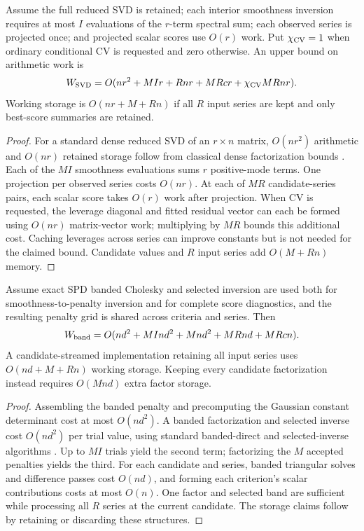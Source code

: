 \begin{theorem}\label{thm:svdwork}
Assume the full reduced SVD is retained; each interior smoothness inversion requires at most $I$ evaluations of the $r$-term spectral sum; each observed series is projected once; and projected scalar scores use $O(r)$ work. Put $\chi_{\rm CV}=1$ when ordinary conditional CV is requested and zero otherwise. An upper bound on arithmetic work is
\begin{equation}\label{eq:svdwork}
W_{\rm SVD}
=O(nr^2+MIr+Rnr+MRcr+\chi_{\rm CV}MRnr).
\end{equation}
Working storage is $O(nr+M+Rn)$ if all $R$ input series are kept and only best-score summaries are retained.
\end{theorem}
\begin{proof}
For a standard dense reduced SVD of an $r\times n$ matrix, $O(nr^2)$ arithmetic and $O(nr)$ retained storage follow from classical dense factorization bounds \citep{golubvanloan2013}. Each of the $MI$ smoothness evaluations sums $r$ positive-mode terms. One projection per observed series costs $O(nr)$. At each of $MR$ candidate-series pairs, each scalar score takes $O(r)$ work after projection. When CV is requested, the leverage diagonal and fitted residual vector can each be formed using $O(nr)$ matrix-vector work; multiplying by $MR$ bounds this additional cost. Caching leverages across series can improve constants but is not needed for the claimed bound. Candidate values and $R$ input series add $O(M+Rn)$ memory.
\end{proof}

\begin{theorem}\label{thm:bandwork}
Assume exact SPD banded Cholesky and selected inversion are used both for smoothness-to-penalty inversion and for complete score diagnostics, and the resulting penalty grid is shared across criteria and series. Then
\begin{equation}\label{eq:bandwork}
W_{\rm band}
=O(nd^2+MInd^2+Mnd^2+MRnd+MRcn).
\end{equation}
A candidate-streamed implementation retaining all input series uses $O(nd+M+Rn)$ working storage. Keeping every candidate factorization instead requires $O(Mnd)$ extra factor storage.
\end{theorem}
\begin{proof}
Assembling the banded penalty and precomputing the Gaussian constant determinant cost at most $O(nd^2)$. A banded factorization and selected inverse cost $O(nd^2)$ per trial value, using standard banded-direct and selected-inverse algorithms \citep{golubvanloan2013,erisman1975,weinert2007}. Up to $MI$ trials yield the second term; factorizing the $M$ accepted penalties yields the third. For each candidate and series, banded triangular solves and difference passes cost $O(nd)$, and forming each criterion's scalar contributions costs at most $O(n)$. One factor and selected band are sufficient while processing all $R$ series at the current candidate. The storage claims follow by retaining or discarding these structures.
\end{proof}

